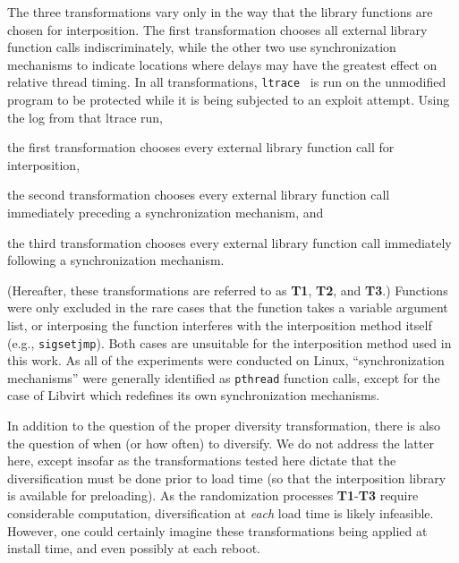The three transformations vary only in the way that the library functions are chosen for interposition.
The first transformation chooses all external library function calls indiscriminately, while the other two use synchronization mechanisms to indicate locations where delays may have the greatest effect on relative thread timing.
In all transformations, \texttt{ltrace}~\cite{cespedesltrace} is run on the unmodified program to be protected while it is being subjected to an exploit attempt.
Using the log from that ltrace run,
\begin{description}\addtolength{\itemsep}{-.35\baselineskip}
	\item[T1] the first transformation chooses every external library function call for interposition,
	\item[T2] the second transformation chooses every external library function call immediately preceding a synchronization mechanism, and
	\item[T3] the third transformation chooses every external library function call immediately following a synchronization mechanism.
\end{description}
(Hereafter, these transformations are referred to as \textbf{T1}, \textbf{T2}, and \textbf{T3}.)
Functions were only excluded in the rare cases that the function takes a
variable argument list, or interposing the function interferes with the
interposition method itself (e.g., \texttt{sigsetjmp}).
Both cases are unsuitable for the interposition method used in this work.
As all of the experiments were conducted on Linux, ``synchronization
mechanisms'' were generally identified as \texttt{pthread} function calls, except for the case of Libvirt which redefines its own synchronization mechanisms.

In addition to the question of the proper diversity transformation, there is also the question of when (or how often) to diversify.
We do not address the latter here, except insofar as the transformations tested here dictate that the diversification must be done prior to load time (so that the interposition library is available for preloading).
As the randomization processes \textbf{T1}-\textbf{T3} require considerable computation, diversification at \textit{each} load time is likely infeasible.
However, one could certainly imagine these transformations being applied at install time, and even possibly at each reboot.